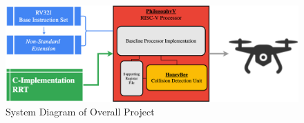 \begin{figure}[H]
\begin{center}
\includegraphics[width=\linewidth]{chapters/chapter1/img/systemDiagram.png}
\caption{System Diagram of Overall Project}
\label{fig:systemDiagram}
\end{center}
\end{figure}